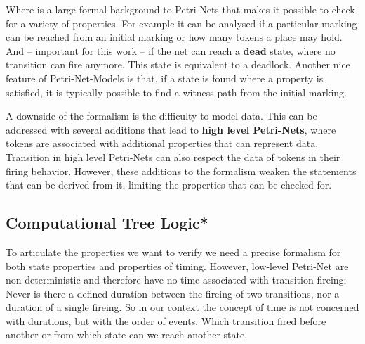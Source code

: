 Where is a large formal background to Petri-Nets that makes it possible to check for a variety of properties.
For example it can be analysed if a particular marking can be reached from an initial marking or how many tokens a place may hold.
And -- important for this work -- if the net can reach a \textbf{dead} state, where no transition can fire anymore.
This state is equivalent to a deadlock.
Another nice feature of Petri-Net-Models is that, if a state is found where a property is satisfied, it is typically possible to find a witness path from the initial marking.

A downside of the formalism is the difficulty to model data.
This can be addressed with several additions that lead to \textbf{high level Petri-Nets}, where tokens are associated with additional properties that can represent data.
Transition in high level Petri-Nets can also respect the data of tokens in their firing behavior.
However, these additions to the formalism weaken the statements that can be derived from it, limiting the properties that can be checked for.

\subsection{Computational Tree Logic*}
\label{rel_ctl}
To articulate the properties we want to verify we need a precise formalism for both state properties and properties of timing.
However, low-level Petri-Net are non deterministic and therefore have no time associated with transition fireing;
Never is there a defined duration between the fireing of two transitions, nor a duration of a single fireing.
So in our context the concept of time is not concerned with durations, but with the order of events.
Which transition fired before another or from which state can we reach another state.


